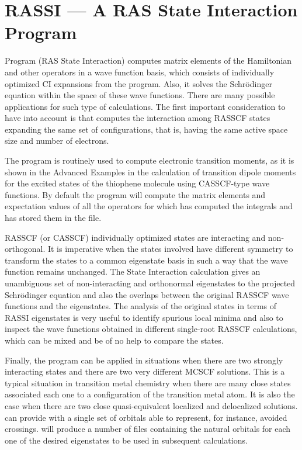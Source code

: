 \section{RASSI --- A RAS State Interaction Program}
\label{TUT:sec:rassi}

Program  (RAS State Interaction) computes matrix elements
of the Hamiltonian and other operators in a wave function basis, which
consists of individually optimized CI expansions from the 
program. Also, it solves the Schr\"odinger equation within the space of
these wave functions. There are many possible applications for such type
of calculations. The first important consideration to have into account
is that  computes the interaction among RASSCF states
expanding the same set of configurations, that is,
having the same active space size and number of electrons.

The  program is routinely used to compute electronic
transition moments, as it is shown in the Advanced Examples in the
calculation of transition dipole moments for the
excited states of the thiophene molecule using CASSCF-type wave functions. 
By default the program will compute the matrix elements and expectation values 
of all the operators for which  has computed the integrals
and has stored them in the  file. 


RASSCF (or CASSCF) individually optimized states are interacting and
non-orthogonal. It is imperative when the states involved have different
symmetry to transform the states to a common eigenstate basis in such
a way that the wave function remains unchanged. The State Interaction
calculation gives an unambiguous set of non-interacting and orthonormal
eigenstates to the projected Schr\"odinger equation and also the
overlaps between the original RASSCF wave functions and the eigenstates.
The analysis of the original states in terms of RASSI eigenstates is
very useful to identify spurious local minima and also to inspect the
wave functions obtained in different single-root RASSCF calculations,
which can be mixed and be of no help to compare the states.

Finally, the  program can be applied in situations when
there are two strongly interacting states and there are two very different 
MCSCF solutions. This is a typical situation in transition metal chemistry
when there are many close states associated each one to a configuration
of the transition metal atom. It is also the case when there are two
close quasi-equivalent localized and delocalized solutions. 
can provide with a single set of orbitals able to represent, for instance,
avoided crossings.  will produce a
number of files containing the natural orbitals for
each one of the desired eigenstates to be used in subsequent calculations.

